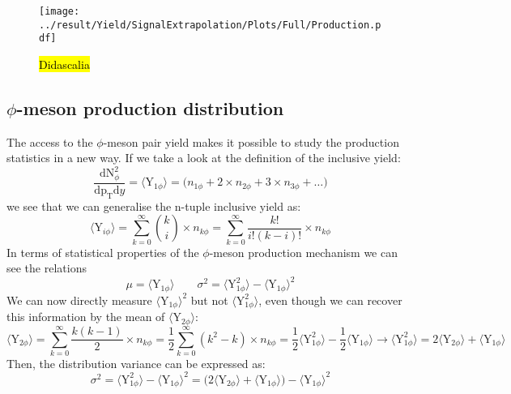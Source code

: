 \begin{figure}
\texttt{[image: ../result/Yield/SignalExtrapolation/Plots/Full/Production.pdf]}
\caption{\hl{Didascalia}}
\label{fig:Production}
\end{figure}

\subsection{$\phi$-meson production distribution}
The access to the $\phi$-meson pair yield makes it possible to study the production statistics in a new way. If we take a look at the definition of the inclusive yield:
\begin{equation}
\frac{\text{dN}^2_{\phi}}{\text{dp}_{\text{T}}\text{d}y} = \langle \text{Y}_{1\phi} \rangle = \Big( n_{1\phi} + 2\times n_{2\phi} + 3\times n_{3\phi} + \dots \Big)
\label{eq:}
\end{equation}
we see that we can generalise the n-tuple inclusive yield as:
\begin{equation}
\langle \text{Y}_{i\phi} \rangle = \sum_{k=0}^{\infty} \binom{k}{i}\times n_{k\phi} = \sum_{k=0}^{\infty} \frac{k!}{i!(k-i)!} \times n_{k\phi} 
\label{eq:}
\end{equation}
In terms of statistical properties of the $\phi$-meson production mechanism we can see the relations
\begin{equation}
\mu = \langle \text{Y}_{1\phi} \rangle \qquad \sigma^2 = \langle \text{Y}_{1\phi}^2 \rangle -  \langle \text{Y}_{1\phi} \rangle^2
\label{eq:}
\end{equation}
We can now directly measure $\langle \text{Y}_{1\phi} \rangle^2$ but not $\langle \text{Y}_{1\phi}^2 \rangle$, even though we can recover this information by the mean of $\langle \text{Y}_{2\phi} \rangle$:
\begin{equation}
\langle \text{Y}_{2\phi} \rangle = \sum_{k=0}^{\infty} \frac{k(k-1)}{2} \times n_{k\phi} = \frac{1}{2} \sum_{k=0}^{\infty} (k^2-k) \times n_{k\phi} = \frac{1}{2}\langle \text{Y}^2_{1\phi} \rangle - \frac{1}{2}\langle \text{Y}_{1\phi} \rangle \to \langle \text{Y}^2_{1\phi} \rangle = 2\langle \text{Y}_{2\phi} \rangle + \langle \text{Y}_{1\phi} \rangle
\label{eq:}
\end{equation}
Then, the distribution variance can be expressed as:
\begin{equation}
\sigma^2 = \langle \text{Y}_{1\phi}^2 \rangle -  \langle \text{Y}_{1\phi} \rangle^2 = \Big(  2\langle \text{Y}_{2\phi} \rangle + \langle \text{Y}_{1\phi} \rangle \Big) - \langle \text{Y}_{1\phi} \rangle^2
\label{eq:}
\end{equation}
